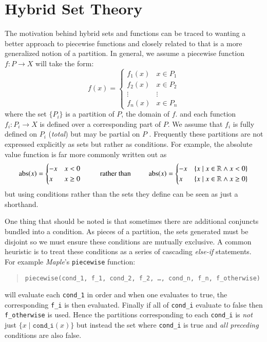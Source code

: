 \chapter{Hybrid Set Theory}

%
%

The motivation behind hybrid sets and functions can be traced to wanting a better approach to piecewise functions
and closely related to that is a more generalized notion of a partition.
In general, we assume a piecewise function $f : P \to X$ will take the form:
\begin{equation}
	\label{eq_fP}
	f(x) = 
	     \begin{cases}
	       f_1(x) & x \in P_1 \\
	       f_2(x) & x \in P_2 \\ 
	       \vdots & \vdots \\
	       f_n(x) & x \in P_n
	     \end{cases}
\end{equation}
where the set $\{ P _ i \}$ is a partition of $P$, the domain of $f$.
and each function $f_i: P_i \to X$ is defined over a corresponding part of $P$. 
We assume that $f_i$ is fully defined on $P_i$ (\emph{total}) but may be partial on $P$ .
Frequently these partitions are not expressed explicitly as sets but rather as conditions.
For example, the absolute value function is far more commonly written out as
\begin{equation*}
	\text{abs}(x) = \begin{cases} -x & x < 0 \\ x & x \geq 0 \end{cases}
	\;\;\;\;\;\;\;\;\;\text{rather than}\;\;\;\;\;\;\;\;\;
	\text{abs}(x) = 
	\begin{cases}
		-x & \{x \;|\; x \in \mathbb{R} \wedge x < 0\}  \\ 
		x & \{x \;|\; x \in \mathbb{R} \wedge x \geq 0 \}
	\end{cases}
\end{equation*}
but using conditions rather than the sets they define can be seen as just a shorthand. 


One thing that should be noted is that sometimes there are additional conjuncts bundled into a condition.
As pieces of a partition, the sets generated must be disjoint so we must ensure these conditions are mutually exclusive.
A common heuristic is to treat these conditions as a series of cascading \emph{else-if} statements.
For example \emph{Maple}'s \texttt{piecewise} function:
\begin{quote}
	\texttt{piecewise(cond\_1, f\_1, cond\_2, f\_2, \ldots, cond\_n, f\_n, f\_otherwise)} 
\end{quote}	
will evaluate each \texttt{cond\_1} in order and when one evaluates to true, the corresponding \texttt{f\_i} is then evaluated.
Finally if all of \texttt{cond\_i} evaluate to false then \texttt{f\_otherwise} is used.
Hence the partitions corresponding to each \texttt{cond\_i} is \emph{not} just $\{ x \;|\; \texttt{cond\_i}(x) \}$
but instead the set where \texttt{cond\_i} is true and \emph{all preceding} conditions are also false.


